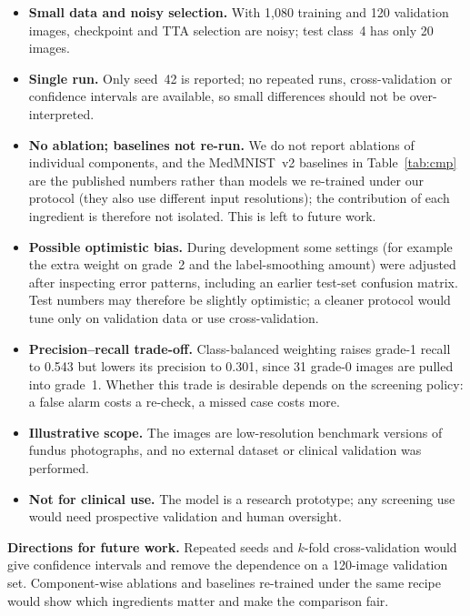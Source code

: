 \documentclass[10pt,twocolumn]{article}
\begin{document}
\begin{itemize}
\item \textbf{Small data and noisy selection.} With 1,080 training and 120 validation images, checkpoint and TTA selection are noisy; test class~4 has only 20 images.
\item \textbf{Single run.} Only seed~42 is reported; no repeated runs, cross-validation or confidence intervals are available, so small differences should not be over-interpreted.
\item \textbf{No ablation; baselines not re-run.} We do not report ablations of individual components, and the MedMNIST~v2 baselines in Table~\ref{tab:cmp} are the published numbers rather than models we re-trained under our protocol (they also use different input resolutions); the contribution of each ingredient is therefore not isolated. This is left to future work.
\item \textbf{Possible optimistic bias.} During development some settings (for example the extra weight on grade~2 and the label-smoothing amount) were adjusted after inspecting error patterns, including an earlier test-set confusion matrix. Test numbers may therefore be slightly optimistic; a cleaner protocol would tune only on validation data or use cross-validation.
\item \textbf{Precision--recall trade-off.} Class-balanced weighting raises grade-1 recall to 0.543 but lowers its precision to 0.301, since 31 grade-0 images are pulled into grade~1. Whether this trade is desirable depends on the screening policy: a false alarm costs a re-check, a missed case costs more.
\item \textbf{Illustrative scope.} The images are low-resolution benchmark versions of fundus photographs, and no external dataset or clinical validation was performed.
\item \textbf{Not for clinical use.} The model is a research prototype; any screening use would need prospective validation and human oversight.
\end{itemize}

\textbf{Directions for future work.} Repeated seeds and $k$-fold cross-validation would give confidence intervals and remove the dependence on a 120-image validation set. Component-wise ablations and baselines re-trained under the same recipe would show which ingredients matter and make the comparison fair.

\end{document}
